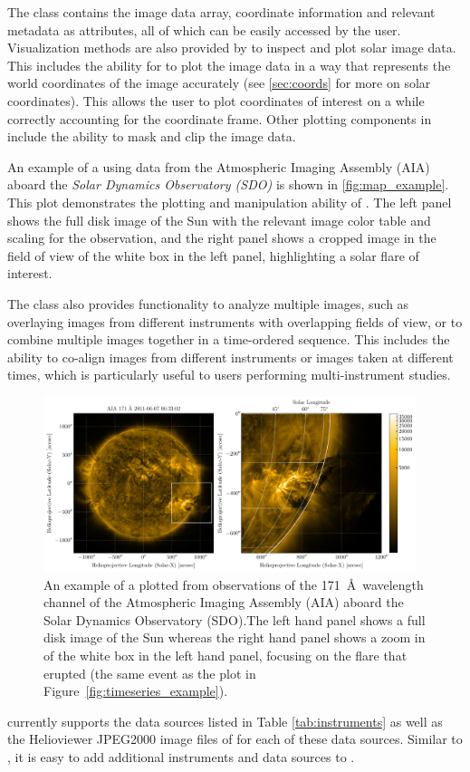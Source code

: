 The \Map class contains the image data array, coordinate information and relevant metadata as attributes, all of which can be easily accessed by the user. 
Visualization methods are also provided by \Map to inspect and plot solar image data. 
This includes the ability for \Map to plot the image data in a way that represents the world coordinates of the image accurately (see \autoref{sec:coords} for more on solar coordinates).
This allows the user to plot coordinates of interest on a \Map while correctly accounting for the coordinate frame. 
Other plotting components in \Map include the ability to mask and clip the image data. 

An example of a \Map using data from the Atmospheric Imaging Assembly (AIA) aboard the \textit{Solar Dynamics Observatory (SDO)} is shown in \autoref{fig:map_example}. 
This plot demonstrates the plotting and manipulation ability of \Map.
The left panel shows the full disk image of the Sun with the relevant image color table and scaling for the observation, and the right panel shows a cropped image in the field of view of the white box in the left panel, highlighting a solar flare of interest.

The \Map class also provides functionality to analyze multiple images, such as overlaying images from different instruments with overlapping fields of view, or to combine multiple images together in a time-ordered sequence.  
This includes the ability to co-align images from different instruments or images taken at different times, which is particularly useful to users performing multi-instrument studies. 


\begin{figure}
    \centering
    \includegraphics[width=0.97\textwidth]{figures/map_example.pdf}
    \caption{An example of a \sunpypkg \Map plotted from observations of the 171~\AA\ wavelength channel of the Atmospheric Imaging Assembly (AIA) aboard the Solar Dynamics Observatory (SDO).The left hand panel shows a full disk image of the Sun whereas the right hand panel shows a zoom in of the white box in the left hand panel, focusing on the flare that erupted (the same event as the \Timeseries plot in Figure~\ref{fig:timeseries_example}).}
    \label{fig:map_example}
\end{figure}

\Map currently supports the data sources listed in Table \ref{tab:instruments} as well as the Helioviewer JPEG2000 image files of for each of these data sources. Similar to \Timeseries, it is easy to add additional instruments and data sources to \Map. 
